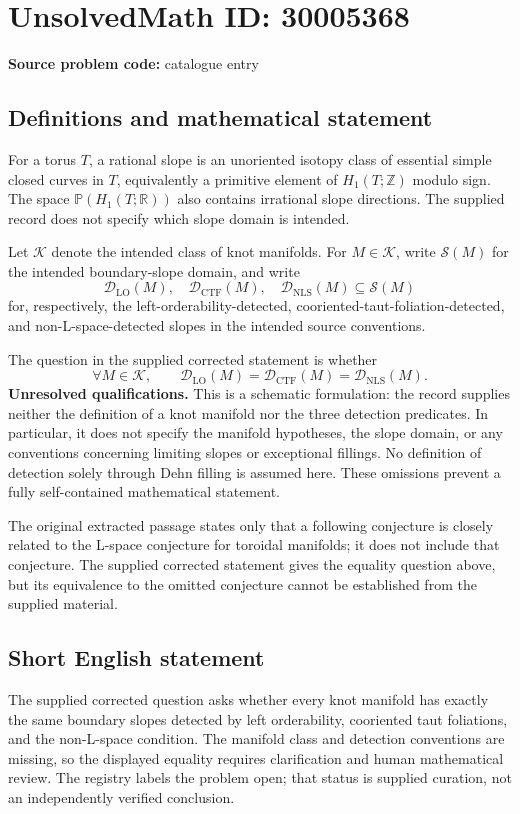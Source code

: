 \documentclass[11pt]{article}
\newcommand{\Z}{\mathbb{Z}}
\newcommand{\R}{\mathbb{R}}
\newcommand{\PP}{\mathbb{P}}
\begin{document}
\section*{UnsolvedMath ID: 30005368}
\textbf{Source problem code:} catalogue entry
\subsection{Definitions and mathematical statement}
For a torus \(T\), a rational slope is an unoriented isotopy class of essential simple closed curves in \(T\), equivalently a primitive element of \(H_1(T;\Z)\) modulo sign. The space \(\PP(H_1(T;\R))\) also contains irrational slope directions. The supplied record does not specify which slope domain is intended.

Let \(\mathcal K\) denote the intended class of knot manifolds. For \(M\in\mathcal K\), write \(\mathcal S(M)\) for the intended boundary-slope domain, and write
\[
\mathcal D_{\mathrm{LO}}(M),\quad
\mathcal D_{\mathrm{CTF}}(M),\quad
\mathcal D_{\mathrm{NLS}}(M)\subseteq\mathcal S(M)
\]
for, respectively, the left-orderability-detected, cooriented-taut-foliation-detected, and non-L-space-detected slopes in the intended source conventions.

The question in the supplied corrected statement is whether
\[
\forall M\in\mathcal K,\qquad
\mathcal D_{\mathrm{LO}}(M)
=
\mathcal D_{\mathrm{CTF}}(M)
=
\mathcal D_{\mathrm{NLS}}(M).
\]
\textbf{Unresolved qualifications.} This is a schematic formulation: the record supplies neither the definition of a knot manifold nor the three detection predicates. In particular, it does not specify the manifold hypotheses, the slope domain, or any conventions concerning limiting slopes or exceptional fillings. No definition of detection solely through Dehn filling is assumed here. These omissions prevent a fully self-contained mathematical statement.

The original extracted passage states only that a following conjecture is closely related to the L-space conjecture for toroidal manifolds; it does not include that conjecture. The supplied corrected statement gives the equality question above, but its equivalence to the omitted conjecture cannot be established from the supplied material.
\subsection{Short English statement}
The supplied corrected question asks whether every knot manifold has exactly the same boundary slopes detected by left orderability, cooriented taut foliations, and the non-L-space condition. The manifold class and detection conventions are missing, so the displayed equality requires clarification and human mathematical review. The registry labels the problem open; that status is supplied curation, not an independently verified conclusion.
\end{document}
